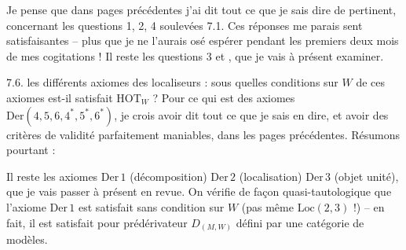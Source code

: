 Je pense que dans  pages précédentes j'ai dit tout ce que je sais dire de pertinent, concernant les questions 1, 2, 4 soulevées  7.1. Ces réponses me parais%
%
%
sent satisfaisantes -- plus  que je ne l'aurais osé espérer pendant les premiers deux mois de mes cogitations ! Il reste les questions 3 et , que je vais à présent examiner.

7.6.  les différents axiomes des localiseurs : sous quelles conditions sur $W$  de ces axiomes est-il satisfait  $\mathrm{HOT}_W$ ? Pour ce qui est des axiomes $\mathrm{Der}(4,5,6,4^*,5^*,6^*)$, je crois avoir dit tout ce que je sais en dire, et avoir des critères de validité parfaitement maniables, dans les pages précédentes. Résumons pourtant :

Il reste les axiomes $\mathrm{Der}\,1$ (décomposition) $\mathrm{Der}\,2$ (localisation) $\mathrm{Der}\,3$ (objet unité), que je vais passer à présent en revue. On vérifie
de façon quasi-tautologique que l'axiome $\mathrm{Der}\,1$ est satisfait sans condition sur $W$ (pas même $\mathrm{Loc}(2,3)$ !) -- en fait, il est satisfait pour  prédérivateur $D_{(M,W)}$ défini par une catégorie de modèles.

